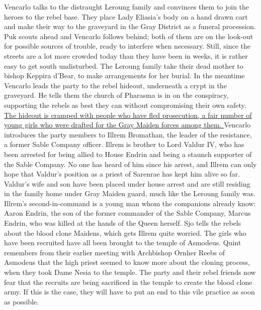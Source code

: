 Vencarlo talks to the distraught Leroung family and convinces them to join the heroes to the rebel base. They place Lady Eliasia's body on a hand drawn cart and make their way to the graveyard in the Gray District as a funeral procession. Puk scouts ahead and Vencarlo follows behind; both of them are on the look-out for possible sources of trouble, ready to interfere when necessary. Still, since the streets are a lot more crowded today than they have been in weeks, it is rather easy to get south undisturbed. The Leroung family take their dead mother to bishop Keppira d'Bear, to make arrangements for her burial. In the meantime Vencarlo leads the party to the rebel hideout, underneath a crypt in the graveyard. He tells them the church of Pharasma is in on the conspiracy, supporting the rebels as best they can without compromising their own safety.\\

\hyperref[fig:Rebel-base-in-Korvosa-Curse-of-the-Crimson-Throne-614606623]{ The hideout is cramped with people who have fled prosecution, a fair number of young girls who were drafted for the Gray Maiden forces among them. } Vencarlo introduces the party members to Illrem Bromathan, the leader of the resistance, a former Sable Company officer. Illrem is brother to Lord Valdur IV, who has been arrested for being allied to House Endrin and being a staunch supporter of the Sable Company. No one has heard of him since his arrest, and Illrem can only hope that Valdur's position as a priest of Sarenrae has kept him alive so far. Valdur's wife and son have been placed under house arrest and are still residing in the family home under Gray Maiden guard, much like the Leroung family was. Illrem's second-in-command is a young man whom the companions already know: Aaron Endrin, the son of the former commander of the Sable Company, Marcus Endrin, who was killed at the hands of the Queen herself. Sjo tells the rebels about the blood clone Maidens, which gets Illrem quite worried. The girls who have been recruited have all been brought to the temple of Asmodeus. Quint remembers from their earlier meeting with Archbishop Ornher Reebs of Asmodeus that the high priest seemed to know more about the cloning process, when they took Dame Nesia to the temple. The party and their rebel friends now fear that the recruits are being sacrificed in the temple to create the blood clone army. If this is the case, they will have to put an end to this vile practice as soon as possible. \\

